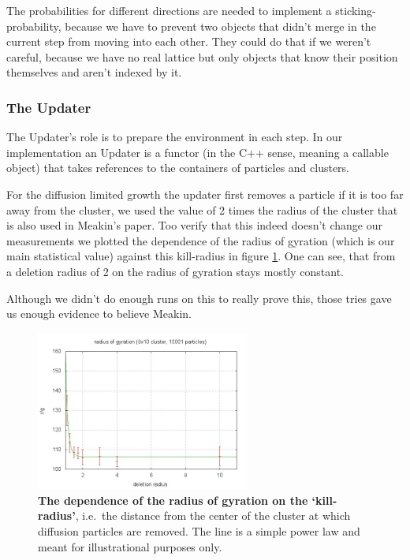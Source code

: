 \documentclass[twocolumn, 10pt]{scrartcl}
\begin{document}
                The probabilities for different directions are needed to implement a sticking-probability, because we
                have to prevent two objects that didn't merge in the current step from moving into each other. They
                could do that if we weren't careful, because we have no real lattice but only objects that know their
                position themselves and aren't indexed by it.

            \subsubsection{The Updater}
                The Updater's role is to prepare the environment in each step. In our implementation an Updater is a
                functor (in the C++ sense, meaning a callable object) that takes references to the containers of
                particles and clusters.

                For the diffusion limited growth the updater first removes a particle if it is too far away from the
                cluster, we used the value of 2 times the radius of the cluster that is also used in Meakin's paper. Too
                verify that this indeed doesn't change our measurements we plotted the dependence of the radius of
                gyration (which is our main statistical value) against this kill-radius in figure \ref{fig-killradius}.
                One can see, that from a deletion radius of 2 on the radius of gyration stays mostly constant.
                
                Although we didn't do enough runs on this to really prove this, those tries gave us enough evidence to
                believe Meakin.
                \begin{figure}
                    \center
                    \includegraphics[width=7cm]{img/killradius.jpg}
                    \caption[The dependence of the radius of gyration on the `kill-radius']
                        {\small\textbf{The dependence of the radius of gyration on the `kill-radius'}, i.e.\ the distance
                        from the center of the cluster at which diffusion particles are removed. The line is a simple power
                        law and meant for illustrational purposes only.}
                    \label{fig-killradius}
                \end{figure}
\end{document}
